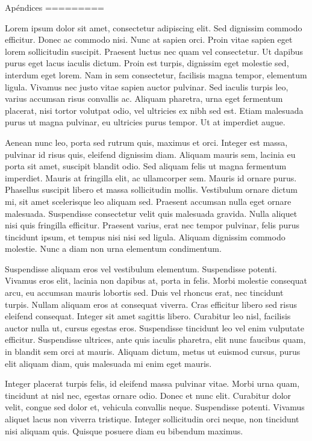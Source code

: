 Apéndices
=========


Lorem ipsum dolor sit amet, consectetur adipiscing elit. Sed dignissim commodo efficitur. Donec ac commodo nisi. Nunc at sapien orci. Proin vitae sapien eget lorem sollicitudin suscipit. Praesent luctus nec quam vel consectetur. Ut dapibus purus eget lacus iaculis dictum. Proin est turpis, dignissim eget molestie sed, interdum eget lorem. Nam in sem consectetur, facilisis magna tempor, elementum ligula. Vivamus nec justo vitae sapien auctor pulvinar. Sed iaculis turpis leo, varius accumsan risus convallis ac. Aliquam pharetra, urna eget fermentum placerat, nisi tortor volutpat odio, vel ultricies ex nibh sed est. Etiam malesuada purus ut magna pulvinar, eu ultricies purus tempor. Ut at imperdiet augue.

Aenean nunc leo, porta sed rutrum quis, maximus et orci. Integer est massa, pulvinar id risus quis, eleifend dignissim diam. Aliquam mauris sem, lacinia eu porta sit amet, suscipit blandit odio. Sed aliquam felis ut magna fermentum imperdiet. Mauris at fringilla elit, ac ullamcorper sem. Mauris id ornare purus. Phasellus suscipit libero et massa sollicitudin mollis. Vestibulum ornare dictum mi, sit amet scelerisque leo aliquam sed. Praesent accumsan nulla eget ornare malesuada. Suspendisse consectetur velit quis malesuada gravida. Nulla aliquet nisi quis fringilla efficitur. Praesent varius, erat nec tempor pulvinar, felis purus tincidunt ipsum, et tempus nisi nisi sed ligula. Aliquam dignissim commodo molestie. Nunc a diam non urna elementum condimentum.

Suspendisse aliquam eros vel vestibulum elementum. Suspendisse potenti. Vivamus eros elit, lacinia non dapibus at, porta in felis. Morbi molestie consequat arcu, eu accumsan mauris lobortis sed. Duis vel rhoncus erat, nec tincidunt turpis. Nullam aliquam eros at consequat viverra. Cras efficitur libero sed risus eleifend consequat. Integer sit amet sagittis libero. Curabitur leo nisl, facilisis auctor nulla ut, cursus egestas eros. Suspendisse tincidunt leo vel enim vulputate efficitur. Suspendisse ultrices, ante quis iaculis pharetra, elit nunc faucibus quam, in blandit sem orci at mauris. Aliquam dictum, metus ut euismod cursus, purus elit aliquam diam, quis malesuada mi enim eget mauris.

Integer placerat turpis felis, id eleifend massa pulvinar vitae. Morbi urna quam, tincidunt at nisl nec, egestas ornare odio. Donec et nunc elit. Curabitur dolor velit, congue sed dolor et, vehicula convallis neque. Suspendisse potenti. Vivamus aliquet lacus non viverra tristique. Integer sollicitudin orci neque, non tincidunt nisi aliquam quis. Quisque posuere diam eu bibendum maximus.